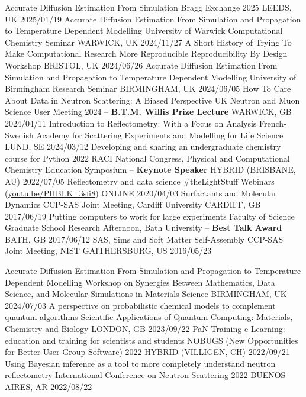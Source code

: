 \vspace{-0.4cm}
\begin{cvhonors}
  \cvhonor
    {Accurate Diffusion Estimation From Simulation}
    {Bragg Exchange 2025}
    {LEEDS, UK}
    {2025/01/19}
  \cvhonor
    {Accurate Diffusion Estimation From Simulation and Propagation to Temperature Dependent Modelling}
    {University of Warwick Computational Chemistry Seminar}
    {WARWICK, UK}
    {2024/11/27}
  \cvhonor
    {A Short History of Trying To Make Computational Research More Reproducible}
    {Reproducibility By Design Workshop}
    {BRISTOL, UK}
    {2024/06/26}
  \cvhonor
    {Accurate Diffusion Estimation From Simulation and Propagation to Temperature Dependent Modelling}
    {University of Birmingham Research Seminar}
    {BIRMINGHAM, UK}
    {2024/06/05}
  \cvhonor
    {How To Care About Data in Neutron Scattering: A Biased Perspective}
    {UK Neutron and Muon Science User Meeting 2024 -- \textbf{B.T.M. Willis Prize Lecture}}
    {WARWICK, GB}
    {2024/04/11}
  \cvhonor
    {Introduction to Reflectometry: With a Focus on Analysis}
    {French-Swedish Academy for Scattering Experiments and Modelling for Life Science}
    {LUND, SE}
    {2024/03/12}
  \cvhonor
    {Developing and sharing an undergraduate chemistry course for Python}
    {2022 RACI National Congress, Physical and Computational Chemistry Education Symposium -- \textbf{Keynote Speaker}}
    {HYBRID (BRISBANE, AU)}
    {2022/07/05}
  \cvhonor
    {Reflectometry and data science}
    {\#theLightStuff Webinars (\href{https://youtu.be/PHBLK_3sfi8}{youtu.be/PHBLK\_3sfi8})}
    {ONLINE}
    {2020/04/03}
  \cvhonor
    {Surfactants and Molecular Dynamics}
    {CCP-SAS Joint Meeting, Cardiff University}
    {CARDIFF, GB}
    {2017/06/19}
  \cvhonor
    {Putting computers to work for large experiments}
    {Faculty of Science Graduate School Research Afternoon, Bath University -- \textbf{Best Talk Award}}
    {BATH, GB}
    {2017/06/12}
  \cvhonor
    {SAS, Sims and Soft Matter Self-Assembly}
    {CCP-SAS Joint Meeting, NIST}
    {GAITHERSBURG, US}
    {2016/05/23}
\end{cvhonors}
\begin{cvhonors}
  \cvhonor
    {Accurate Diffusion Estimation From Simulation and Propagation to Temperature Dependent Modelling}
    {Workshop on Synergies Between Mathematics, Data Science, and Molecular Simulations in Materials Science}
    {BIRMINGHAM, UK}
    {2024/07/03}
  \cvhonor
    {A perspective on probabilistic chemical models to complement quantum algorithms}
    {Scientific Applications of Quantum Computing: Materials, Chemistry and Biology}
    {LONDON, GB}
    {2023/09/22}
  \cvhonor
    {PaN-Training e-Learning: education and training for scientists and students}
    {NOBUGS (New Opportunities for Better User Group Software) 2022}
    {HYBRID (VILLIGEN, CH)}
    {2022/09/21}
  \cvhonor
    {Using Bayesian inference as a tool to more completely understand neutron reflectometry}
    {International Conference on Neutron Scattering 2022}
    {BUENOS AIRES, AR}
    {2022/08/22}
\end{cvhonors}
